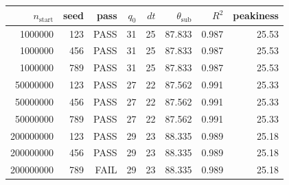 \begin{tabular}{r r r r r r r r}
\hline
$n_{\mathrm{start}}$ & seed & pass & $q_0$ & $dt$ & $\theta_{\mathrm{sub}}$ & $R^2$ & peakiness \\
\hline
1000000 & 123 & PASS & 31 & 25 & 87.833 & 0.987 & 25.53 \\
1000000 & 456 & PASS & 31 & 25 & 87.833 & 0.987 & 25.53 \\
1000000 & 789 & PASS & 31 & 25 & 87.833 & 0.987 & 25.53 \\
50000000 & 123 & PASS & 27 & 22 & 87.562 & 0.991 & 25.33 \\
50000000 & 456 & PASS & 27 & 22 & 87.562 & 0.991 & 25.33 \\
50000000 & 789 & PASS & 27 & 22 & 87.562 & 0.991 & 25.33 \\
200000000 & 123 & PASS & 29 & 23 & 88.335 & 0.989 & 25.18 \\
200000000 & 456 & PASS & 29 & 23 & 88.335 & 0.989 & 25.18 \\
200000000 & 789 & FAIL & 29 & 23 & 88.335 & 0.989 & 25.18 \\
\hline
\end{tabular}
